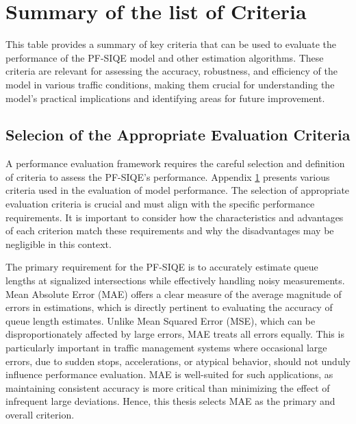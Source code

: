 \chapter{Summary of the list of Criteria}
\label{appendix: Summary of the list of Criteria}

This table provides a summary of key criteria that can be used to evaluate the performance of the PF-SIQE model and other estimation algorithms. These criteria are relevant for assessing the accuracy, robustness, and efficiency of the model in various traffic conditions, making them crucial for understanding the model's practical implications and identifying areas for future improvement.
\section{Selecion of the Appropriate Evaluation Criteria}\label{Selecion of the Appropriate Evaluation Criteria}
A performance evaluation framework requires the careful selection and definition of criteria to assess the PF-SIQE's performance. Appendix \ref{appendix: Summary of the list of Criteria} presents various criteria used in the evaluation of model performance. The selection of appropriate evaluation criteria is crucial and must align with the specific performance requirements. It is important to consider how the characteristics and advantages of each criterion match these requirements and why the disadvantages may be negligible in this context.

The primary requirement for the PF-SIQE is to accurately estimate queue lengths at signalized intersections while effectively handling noisy measurements. Mean Absolute Error (MAE) offers a clear measure of the average magnitude of errors in estimations, which is directly pertinent to evaluating the accuracy of queue length estimates. Unlike Mean Squared Error (MSE), which can be disproportionately affected by large errors, MAE treats all errors equally. This is particularly important in traffic management systems where occasional large errors, due to sudden stops, accelerations, or atypical behavior, should not unduly influence performance evaluation. MAE is well-suited for such applications, as maintaining consistent accuracy is more critical than minimizing the effect of infrequent large deviations. Hence, this thesis selects MAE as the primary and overall criterion.




